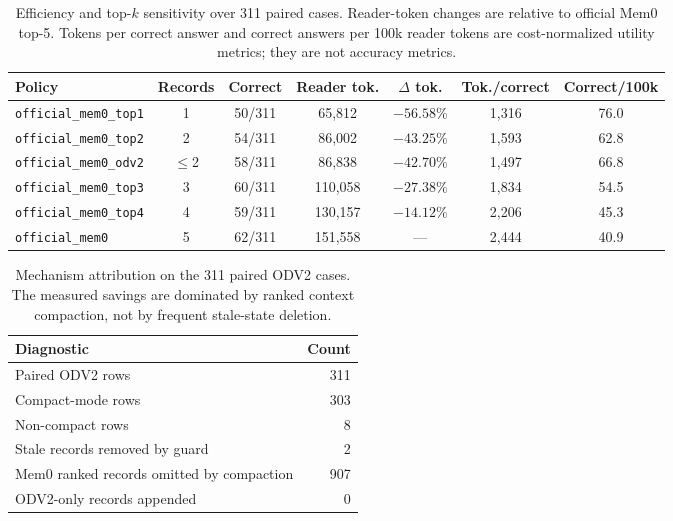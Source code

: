 \documentclass{article}
\begin{document}
\begin{table}[t]
\caption{Efficiency and top-$k$ sensitivity over 311 paired cases. Reader-token changes are relative to official Mem0 top-5. Tokens per correct answer and correct answers per 100k reader tokens are cost-normalized utility metrics; they are not accuracy metrics.}
\label{tab:token_budget}
\vskip 0.15in
\begin{center}
\begin{tiny}
\begin{sc}
\begin{tabular}{lcccccc}
\toprule
Policy & Records & Correct & Reader tok. & $\Delta$ tok. & Tok./correct & Correct/100k \\
\midrule
\texttt{official\_mem0\_top1} & 1 & 50/311 & 65{,}812 & $-56.58\%$ & 1{,}316 & 76.0 \\
\texttt{official\_mem0\_top2} & 2 & 54/311 & 86{,}002 & $-43.25\%$ & 1{,}593 & 62.8 \\
\texttt{official\_mem0\_odv2} & $\leq$2 & 58/311 & 86{,}838 & $-42.70\%$ & 1{,}497 & 66.8 \\
\texttt{official\_mem0\_top3} & 3 & 60/311 & 110{,}058 & $-27.38\%$ & 1{,}834 & 54.5 \\
\texttt{official\_mem0\_top4} & 4 & 59/311 & 130{,}157 & $-14.12\%$ & 2{,}206 & 45.3 \\
\texttt{official\_mem0} & 5 & 62/311 & 151{,}558 & --- & 2{,}444 & 40.9 \\
\bottomrule
\end{tabular}
\end{sc}
\end{tiny}
\end{center}
\vskip -0.1in
\end{table}

\begin{table}[t]
\caption{Mechanism attribution on the 311 paired ODV2 cases. The measured savings are dominated by ranked context compaction, not by frequent stale-state deletion.}
\label{tab:mechanism_attribution}
\vskip 0.15in
\begin{center}
\begin{scriptsize}
\begin{sc}
\begin{tabular}{lr}
\toprule
Diagnostic & Count \\
\midrule
Paired ODV2 rows & 311 \\
Compact-mode rows & 303 \\
Non-compact rows & 8 \\
Stale records removed by guard & 2 \\
Mem0 ranked records omitted by compaction & 907 \\
ODV2-only records appended & 0 \\
\bottomrule
\end{tabular}
\end{sc}
\end{scriptsize}
\end{center}
\vskip -0.1in
\end{table}
\end{document}
